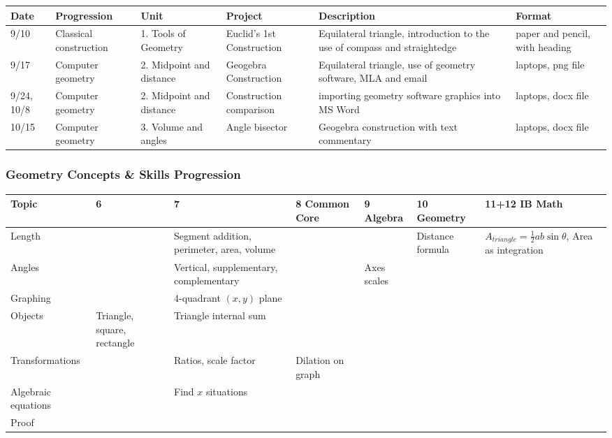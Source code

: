\documentclass[12pt, twoside]{article}
\begin{document}
\begin{tabular}{|p{1cm}|p{2.5cm}|p{3cm}|p{4cm}|p{8cm}|p{4cm}|}
  \hline
  Date & Progression & Unit & Project & Description & Format \\
  \hline
  9/10 & Classical construction & 1. Tools of Geometry & Euclid's 1st Construction & Equilateral triangle, introduction to the use of compass and straightedge & paper and pencil, with heading \\
  \hline
  9/17 & Computer geometry & 2. Midpoint and distance & Geogebra Construction & Equilateral triangle, use of geometry software, MLA and email & laptops, png file \\
  \hline
  9/24, 10/8 & Computer geometry & 2. Midpoint and distance & Construction comparison & importing geometry software graphics into MS Word & laptops, docx file \\
  \hline
  10/15 & Computer geometry & 3. Volume and angles & Angle bisector & Geogebra construction with text commentary & laptops, docx file \\
  \hline
\end{tabular}

\newpage
\subsubsection*{Geometry Concepts \& Skills Progression}

\begin{tabular}{|p{3cm}|p{2cm}|p{4cm}|p{2cm}|p{2cm}|p{3.5cm}|p{4cm}|}
  \hline
  Topic & 6 & 7 & 8 Common Core & 9 Algebra & 10 Geometry & 11+12 IB Math \\
  \hline \hline
  Length &  & Segment addition, perimeter, area, volume &  &  & Distance formula & $A_{triangle}=\frac{1}{2}ab \sin \theta$, Area as integration \\
  \hline
  Angles &  & Vertical, supplementary, complementary & & Axes scales & & \\
  \hline
  Graphing &  & 4-quadrant $(x,y)$ plane &  &  & & \\
  \hline
  Objects & Triangle, square, rectangle  & Triangle internal sum & & & & \\
  \hline
  Transformations &  & Ratios, scale factor & Dilation on graph  & & & \\
  \hline
  Algebraic equations & & Find $x$ situations & & & & \\
  \hline
  Proof & & & & & & \\
  \hline
\end{tabular}
\end{document}
